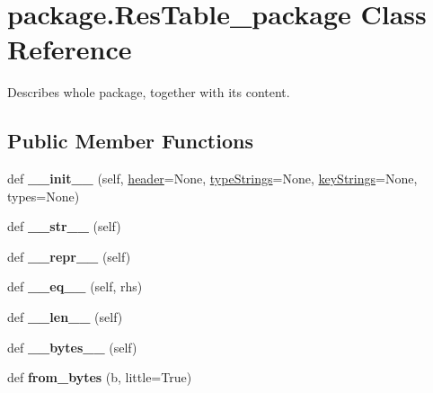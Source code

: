 \hypertarget{classpackage_1_1ResTable__package}{}\section{package.\+Res\+Table\+\_\+package Class Reference}
\label{classpackage_1_1ResTable__package}


Describes whole package, together with its content.  


\subsection*{Public Member Functions}
\begin{DoxyCompactItemize}
\item 
\mbox{\label{classpackage_1_1ResTable__package_a6a222bc384dca865ee75390357e575dc}} 
def {\bfseries \+\_\+\+\_\+init\+\_\+\+\_\+} (self, \mbox{\hyperlink{classpackage_1_1ResTable__package_a09d6e4d17baa35da87d3ac44ef9d6bef}{header}}=None, \mbox{\hyperlink{classpackage_1_1ResTable__package_abb2bd37ba83fe03e836ecd869a1cafa6}{type\+Strings}}=None, \mbox{\hyperlink{classpackage_1_1ResTable__package_a6e813d4278285e770abe6e6659ae78e9}{key\+Strings}}=None, types=None)
\item 
\mbox{\label{classpackage_1_1ResTable__package_af8bb7e5c3a8974991647ac77e80949be}} 
def {\bfseries \+\_\+\+\_\+str\+\_\+\+\_\+} (self)
\item 
\mbox{\label{classpackage_1_1ResTable__package_a5da6477b899bf1e4db20bf7f00dafaee}} 
def {\bfseries \+\_\+\+\_\+repr\+\_\+\+\_\+} (self)
\item 
\mbox{\label{classpackage_1_1ResTable__package_a5308259f774f67bfac628a224b32a5ad}} 
def {\bfseries \+\_\+\+\_\+eq\+\_\+\+\_\+} (self, rhs)
\item 
\mbox{\label{classpackage_1_1ResTable__package_a8ee5b9bda83e393b85f21febd91c02f3}} 
def {\bfseries \+\_\+\+\_\+len\+\_\+\+\_\+} (self)
\item 
\mbox{\label{classpackage_1_1ResTable__package_a9b3e727130abf32afb94a0c6de994211}} 
def {\bfseries \+\_\+\+\_\+bytes\+\_\+\+\_\+} (self)
\item 
\mbox{\label{classpackage_1_1ResTable__package_a982fb6a8c2e28deeef4334c483912c32}} 
def {\bfseries from\+\_\+bytes} (b, little=True)
\end{DoxyCompactItemize}
